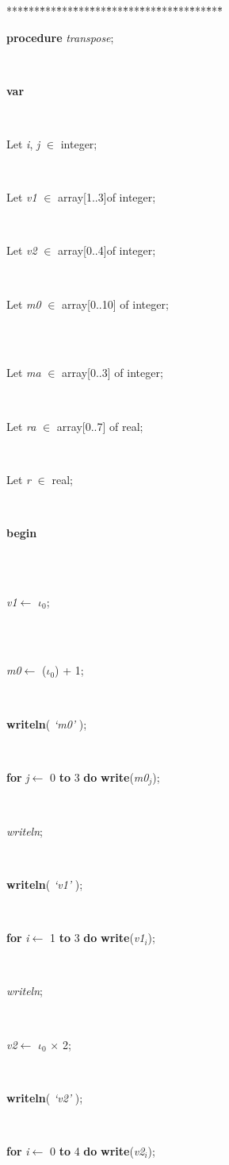 \documentclass[10pt, a4paper]{article}
\begin{document}
\begin{tabbing}
***\=***\=***\=***\=***\=***\=***\=***\=***\=***\=***\=***\=***\=\kill
\parbox{14cm}{\textsf {\textbf {procedure } \textsf{\textit{transpose}}; }}\\
\+\parbox{14cm}{\textsf{\textbf{var} }}\\
\parbox{14cm}{\textsf{Let \textit{i}, \textit{j} $\in$ integer;}}\\
\parbox{14cm}{\textsf{Let \textit{v1} $\in$ array[1..3]of integer;}}\\
\parbox{14cm}{\textsf{Let \textit{v2} $\in$ array[0..4]of integer;}}\\
\parbox{14cm}{\textsf{Let \textit{m0} $\in$ array[0..10] of integer;}}\\
\\
\parbox{14cm}{\textsf{Let \textit{ma} $\in$ array[0..3] of integer;}}\\
\parbox{14cm}{\textsf{Let \textit{ra} $\in$  array[0..7] of real;}}\\
\parbox{14cm}{\textsf{Let \textit{r} $\in$ real;}}\\
\-\<\+\parbox{14cm}{\textsf{\textbf{begin} }}\\
\\
\parbox{14cm}{\textsf{\textit{v1}$\leftarrow$ $\iota_{ 0 }$}; }\\
\\
\parbox{14cm}{\textsf{\textit{m0}$\leftarrow$ ($\iota_{ 0 }$) + 1}; }\\
\parbox{14cm}{\textsf{\textbf{writeln}(\textit{\textrm{\textup { `m0' } }})}; }\\
\parbox{14cm}{\textsf {\textbf {for } \textsf{\textit{j}$\leftarrow$ 0} \textbf{ to } \textsf{3} \textbf{ do } \textsf{\textbf{write}(\textit{m0}$_{\textit{j}}$)}; }}\\
\parbox{14cm}{\textsf{\textit{writeln}}; }\\
\parbox{14cm}{\textsf{\textbf{writeln}(\textit{\textrm{\textup { `v1' } }})}; }\\
\parbox{14cm}{\textsf {\textbf {for } \textsf{\textit{i}$\leftarrow$ 1} \textbf{ to } \textsf{3} \textbf{ do } \textsf{\textbf{write}(\textit{v1}$_{\textit{i}}$)}; }}\\
\parbox{14cm}{\textsf{\textit{writeln}}; }\\
\parbox{14cm}{\textsf{\textit{v2}$\leftarrow$ $\iota_{ 0 }$ $\times$ 2}; }\\
\parbox{14cm}{\textsf{\textbf{writeln}(\textit{\textrm{\textup { `v2' } }})}; }\\
\parbox{14cm}{\textsf {\textbf {for } \textsf{\textit{i}$\leftarrow$ 0} \textbf{ to } \textsf{4} \textbf{ do } \textsf{\textbf{write}(\textit{v2}$_{\textit{i}}$)}; }}\\

\end{tabbing}
\end{document}
